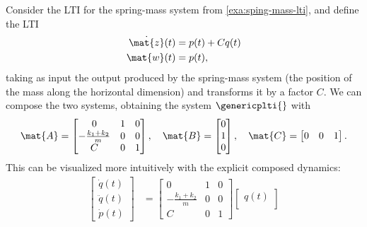 \begin{example}
    Consider the LTI for the spring-mass system from \cref{exa:sping-mass-lti}, and define the LTI
    \begin{equation*}
        \begin{aligned}
            \dot{\mat{z}}(t) & =p(t)+Cq(t) \\
            \mat{w}(t)       & =p(t),
        \end{aligned}
    \end{equation*}
    taking as input the output produced by the spring-mass system (the position of the mass along the horizontal dimension) and transforms it by a factor $C$.
    We can compose the two systems, obtaining the system $\genericplti{}$ with
    \begin{equation*}
        \mat{A}=\begin{bmatrix}0                  & 1 & 0 \\
               -\frac{k_1+k_2}{m} & 0 & 0 \\
               C                  & 0 & 1\end{bmatrix},\quad
        \mat{B}=\begin{bmatrix}
            0 \\
            1 \\
            0
        \end{bmatrix},
        \quad
        \mat{C}=\begin{bmatrix}
            0 & 0 & 1
        \end{bmatrix}.
    \end{equation*}
    This can be visualized more intuitively with the explicit composed dynamics:
    \begin{equation*}
        \begin{aligned}
            \begin{bmatrix}
                \dot{q}(t)  \\
                \ddot{q}(t) \\
                \dot{p}(t)
            \end{bmatrix} & =
            \begin{bmatrix}0                  & 1 & 0 \\
               -\frac{k_1+k_2}{m} & 0 & 0 \\
               C                  & 0 & 1\end{bmatrix} \begin{bmatrix}
                                                                            {q}(t)     \\

\end{bmatrix}
\end{aligned}
\end{equation*}
\end{example}

